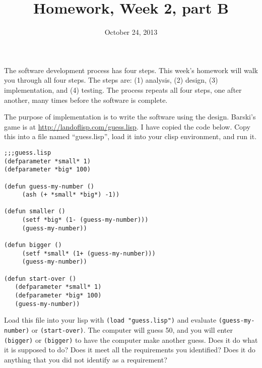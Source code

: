 \documentclass{article}
\title{Homework, Week 2, part B}
\date{October 24, 2013}
\begin{document}
\maketitle{}

The software development process has four steps. This week's homework will walk you through all four steps. The steps are: (1) analysis, (2) design, (3) implementation, and (4) testing. The process repeats all four steps, one after another, many times before the software is complete.

The purpose of implementation is to write the software using the design. Barski's game is at \url{http://landoflisp.com/guess.lisp}. I have copied the code below. Copy this into a file named ``guess.lisp'', load it into your clisp environment, and run it.

\lstset{language=Lisp,numbers=left,keepspaces=true,basicstyle=\small,numberstyle=\tiny}
\begin{lstlisting}
;;;guess.lisp
(defparameter *small* 1)
(defparameter *big* 100)

(defun guess-my-number ()
     (ash (+ *small* *big*) -1))

(defun smaller ()
     (setf *big* (1- (guess-my-number)))
     (guess-my-number))

(defun bigger ()
     (setf *small* (1+ (guess-my-number)))
     (guess-my-number))

(defun start-over ()
   (defparameter *small* 1)
   (defparameter *big* 100)
   (guess-my-number))
\end{lstlisting}

Load this file into your lisp with \texttt{(load "guess.lisp")} and evaluate \texttt{(guess-my-number)} or \texttt{(start-over)}. The computer will guess 50, and you will enter \texttt{(bigger)} or \texttt{(bigger)} to have the computer make another guess. Does it do what it is supposed to do? Does it meet all the requirements you identified? Does it do anything that you did not identify as a requirement?
\end{document}
